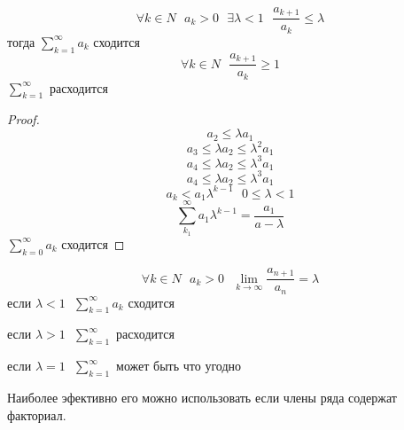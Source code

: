\begin{theorem}
  $$
  \forall k \in N ~~~ a_k > 0 ~~~ \exists \lambda < 1 ~~~
  \frac{a_{k+1}}{a_k} \le \lambda
  $$
  тогда $\sum_{k=1}^{\infty} a_k$ сходится
  $$
  \forall k \in N ~~~ \frac{a_{k+1}}{a_k} \ge 1
  $$
  $\sum_{k=1}^{\infty}$ расходится
\end{theorem}

\begin{proof}
  $$
  a_2 \le \lambda a_1
  $$
  $$
  a_3 \le \lambda a_2 \le \lambda^2 a_1
  $$
  $$
  a_4 \le \lambda a_2 \le \lambda^3 a_1
  $$
  $$
  a_4 \le \lambda a_2 \le \lambda^3 a_1
  $$
  $$
  a_k < a_1 \lambda^{k-1} ~~~ 0 \le \lambda < 1
  $$
  $$
  \sum_{k_1}^{\infty} a_1 \lambda^{k-1} = \frac{a_1}{a-\lambda}
  $$
  $\sum_{k=0}^{\infty} a_k$ сходится
\end{proof}

\begin{theorem}
  $$
  \forall k \in N ~~~ a_k > 0 ~~~
  \lim_{k \to \infty} \frac{a_{n+1}}{a_n} = \lambda
  $$
  если $\lambda < 1 ~~~ \sum_{k=1}^{\infty} a_k$ сходится

  если $\lambda > 1 ~~~ \sum_{k=1}^{\infty}$ расходится

  если $\lambda = 1 ~~~ \sum_{k=1}^{\infty}$ может быть что угодно

  Наиболее эфективно его можно использовать если члены ряда содержат факториал.
\end{theorem}